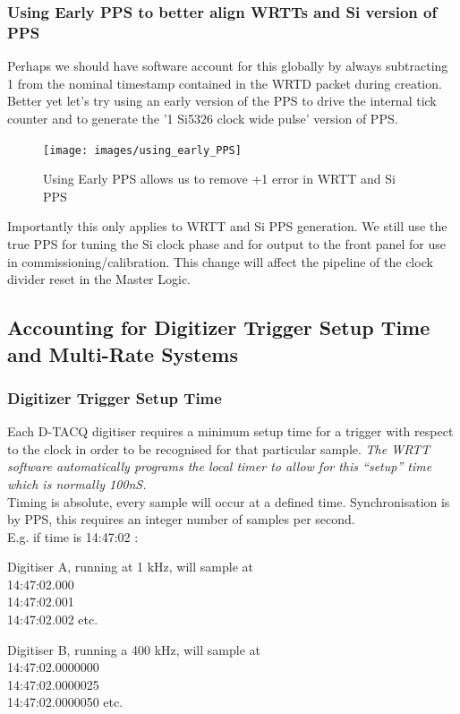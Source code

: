 \documentclass[]{article}
\begin{document}
\subsubsection{Using Early PPS to better align WRTTs and Si version of PPS}

Perhaps we should have software account for this globally by always subtracting 1 from the nominal timestamp contained in the WRTD packet during creation. Better yet let's try using an early version of the PPS to drive the internal tick counter and to generate the '1 Si5326 clock wide pulse' version of PPS.

\begin{figure}[H]
	\centering
	\texttt{[image: images/using\_early\_PPS]}
	\caption{Using Early PPS allows us to remove +1 error in WRTT and Si PPS}
	\label{fig:early_pps}
\end{figure}

Importantly this only applies to WRTT and Si PPS generation. We still use the true PPS for tuning the Si clock phase and for output to the front panel for use in commissioning/calibration. This change will affect the pipeline of the clock divider reset in the Master Logic.

\subsection{Accounting for Digitizer Trigger Setup Time and Multi-Rate Systems}
\subsubsection{Digitizer Trigger Setup Time}

Each D-TACQ digitiser requires a minimum setup time for a trigger with respect to the clock in order to be recognised for that particular sample. \textit{The WRTT software automatically programs the local timer to allow for this “setup” time which is normally 100nS.}\\

Timing is absolute, every sample will occur at a defined time. Synchronisation is by PPS, this requires an integer number of samples per second.\\

E.g. if time is 14:47:02 :\\

\begin{minipage}[c]{0.5\textwidth}
	Digitiser A, running at 1 kHz, will sample at\\14:47:02.000\\14:47:02.001\\14:47:02.002 etc.
\end{minipage}
\begin{minipage}[c]{0.5\textwidth}
	Digitiser B, running a 400 kHz, will sample at\\14:47:02.0000000\\14:47:02.0000025\\14:47:02.0000050 etc.
\end{minipage}\\\\
\end{document}
